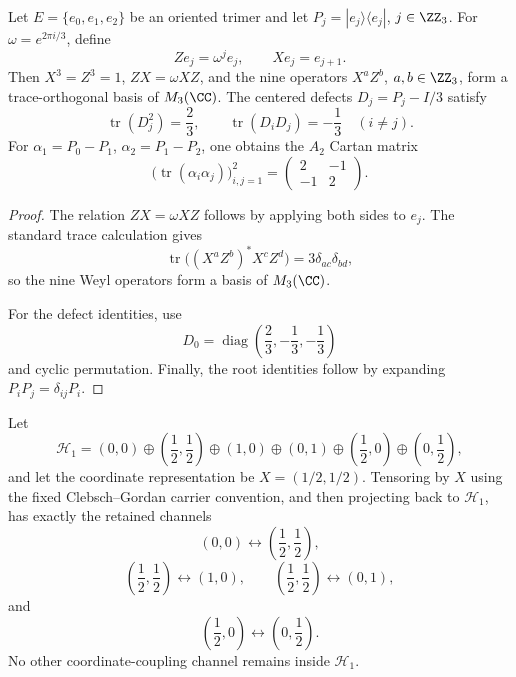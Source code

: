 \documentclass[11pt]{article}
\begin{document}
\begin{proposition}
\label{p1:prop:math-trimer-weyl-a2}
Let \(E=\{e_0,e_1,e_2\}\) be an oriented trimer and let \(P_j=|e_j\rangle\langle e_j|\), \(j\in\ZZ_3\).  For \(\omega=e^{2\pi i/3}\), define
\[
  Ze_j=\omega^j e_j,\qquad Xe_j=e_{j+1}.
\]
Then \(X^3=Z^3=1\), \(ZX=\omega XZ\), and the nine operators \(X^aZ^b\), \(a,b\in\ZZ_3\), form a trace-orthogonal basis of \(M_3(\CC)\).  The centered defects \(D_j=P_j-I/3\) satisfy
\[
  \operatorname{tr}(D_j^2)=\frac23,
  \qquad
  \operatorname{tr}(D_iD_j)=-\frac13\quad(i\ne j).
\]
For \(\alpha_1=P_0-P_1\), \(\alpha_2=P_1-P_2\), one obtains the \(A_2\) Cartan matrix
\[
  \bigl(\operatorname{tr}(\alpha_i\alpha_j)\bigr)_{i,j=1}^2
  =
  \begin{pmatrix}2&-1\\-1&2\end{pmatrix}.
\]
\end{proposition}

\begin{proof}
The relation \(ZX=\omega XZ\) follows by applying both sides to \(e_j\).  The
standard trace calculation gives
\[
  \operatorname{tr}\bigl((X^aZ^b)^*X^cZ^d\bigr)
  =
  3\delta_{ac}\delta_{bd},
\]
so the nine Weyl operators form a basis of \(M_3(\CC)\).

For the defect identities, use
\[
  D_0
  =
  \operatorname{diag}
  \left(
    \frac{2}{3},
    -\frac{1}{3},
    -\frac{1}{3}
  \right)
\]
and cyclic permutation.  Finally, the root identities follow by expanding
\(P_iP_j=\delta_{ij}P_i\).
\end{proof}

\begin{proposition}
\label{p1:prop:math-h1-coordinate-coupling-graph}
Let
\[
\mathcal H_1=(0,0)\oplus\left(\frac12,\frac12\right)\oplus(1,0)\oplus(0,1)\oplus\left(\frac12,0\right)\oplus\left(0,\frac12\right),
\]
and let the coordinate representation be \(X=(1/2,1/2)\).  Tensoring by \(X\) using the fixed Clebsch--Gordan carrier convention, and then projecting back to \(\mathcal H_1\), has exactly the retained channels
\[
  (0,0)\leftrightarrow\left(\frac12,\frac12\right),
\]
\[
  \left(\frac12,\frac12\right)\leftrightarrow(1,0),
  \qquad
  \left(\frac12,\frac12\right)\leftrightarrow(0,1),
\]
and
\[
  \left(\frac12,0\right)\leftrightarrow\left(0,\frac12\right).
\]
No other coordinate-coupling channel remains inside \(\mathcal H_1\).
\end{proposition}
\end{document}
